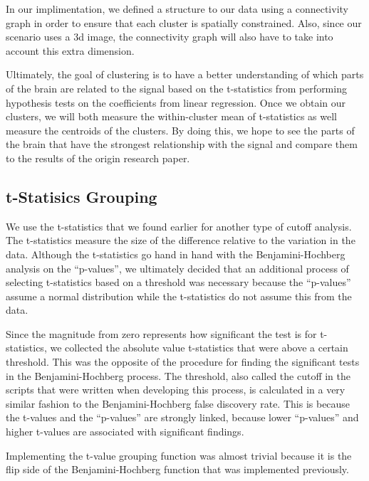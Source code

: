 In our implimentation, we defined a structure to our data using a connectivity
graph in order to ensure that each cluster is spatially constrained. Also,
since our scenario uses a 3d image, the connectivity graph will also have to
take into account this extra dimension.


\par Ultimately, the goal of clustering is to have a better understanding of 
which parts of the brain are related to the signal based on the t-statistics 
from performing hypothesis tests on the coefficients from linear regression.
Once we obtain our clusters, we will both measure the within-cluster mean of
t-statistics as well measure the centroids of the clusters. By doing this, we hope
to see the parts of the brain that have the strongest relationship with the
signal and compare them to the results of the origin research paper.

\subsection{t-Statisics Grouping}

\par We use the t-statistics that we found earlier for another type of cutoff
analysis. The t-statistics measure the size of the difference relative to the 
variation in the data. Although the t-statistics go hand in hand with the 
Benjamini-Hochberg analysis on the ``p-values'', we ultimately decided that an 
additional process of selecting t-statistics based on a threshold was 
necessary because the ``p-values'' assume a normal distribution while the 
t-statistics do not assume this from the data.

\par Since the magnitude from zero represents how significant the test is for
t-statistics, we collected the absolute value t-statistics that were above a 
certain threshold. This was the opposite of the procedure for finding the 
significant tests in the Benjamini-Hochberg process. The threshold, also called
the cutoff in the scripts that were written when developing this process, is 
calculated in a very similar fashion to the Benjamini-Hochberg false discovery 
rate. This is because the t-values and the ``p-values'' are strongly linked,
because lower ``p-values'' and higher t-values are associated with significant 
findings. 

\par Implementing the t-value grouping function was almost trivial because it 
is the flip side of the Benjamini-Hochberg function that was implemented 
previously.

